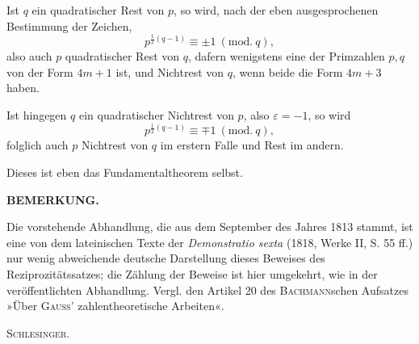 \par\indent Ist $q$ ein quadratischer Rest von $p$, so wird, nach der eben ausgesprochenen Bestimmung der Zeichen,
\[
p^{\frac12(q-1)}\equiv\pm1\ (\mathrm{mod.}\ q),
\]
\noindent also auch $p$ quadratischer Rest von $q$, dafern wenigstens eine der Primzahlen $p,q$ von der Form $4m+1$ ist, und Nichtrest von $q$, wenn beide die Form $4m+3$ haben.

Ist hingegen $q$ ein quadratischer Nichtrest von $p$, also $\varepsilon=-1$, so wird
\[
p^{\frac12(q-1)}\equiv\mp1\ (\mathrm{mod.}\ q),
\]
\noindent folglich auch $p$ Nichtrest von $q$ im erstern Falle und Rest im andern.

Dieses ist eben das Fundamentaltheorem selbst.
\ClosingRule
\bigskip
\begin{center}\textbf{BEMERKUNG.}\end{center}
\begingroup\small
\par\indent Die vorstehende Abhandlung, die aus dem September des Jahres 1813 stammt, ist eine von dem lateinischen Texte der \textit{Demonstratio sexta} (1818, Werke II, S. 55 ff.) nur wenig abweichende deutsche Darstellung dieses Beweises des Reziprozitätssatzes; die Zählung der Beweise ist hier umgekehrt, wie in der veröffentlichten Abhandlung. Vergl. den Artikel 20 des \textsc{Bachmann}schen Aufsatzes »Über \textsc{Gauss}' zahlentheoretische Arbeiten«.
\begin{flushright}\textsc{Schlesinger.}\end{flushright}
\ClosingRule\clearpage
\endgroup
